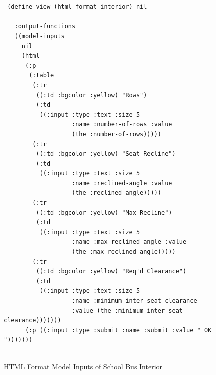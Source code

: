 \documentclass [11pt]{book}
\begin{document}
\begin{figure}
\begin{lrbox}{\boxedverb}
\begin{minipage}{\linewidth}

\begin{verbatim}


 (define-view (html-format interior) nil

   :output-functions
   ((model-inputs
     nil
     (html 
      (:p
       (:table
        (:tr 
         ((:td :bgcolor :yellow) "Rows")
         (:td
          ((:input :type :text :size 5 
                   :name :number-of-rows :value
                   (the :number-of-rows)))))
        (:tr 
         ((:td :bgcolor :yellow) "Seat Recline")
         (:td
          ((:input :type :text :size 5 
                   :name :reclined-angle :value
                   (the :reclined-angle)))))
        (:tr 
         ((:td :bgcolor :yellow) "Max Recline")
         (:td
          ((:input :type :text :size 5 
                   :name :max-reclined-angle :value
                   (the :max-reclined-angle)))))
        (:tr 
         ((:td :bgcolor :yellow) "Req'd Clearance")
         (:td
          ((:input :type :text :size 5 
                   :name :minimum-inter-seat-clearance
                   :value (the :minimum-inter-seat-clearance)))))))
      (:p ((:input :type :submit :name :submit :value " OK ")))))))      
      
\end{verbatim}
\end{minipage}
\end{lrbox}
\fbox{\usebox{\boxedverb}}

\caption{HTML Format Model Inputs of School Bus Interior}

\label{code:school-bus-interior-model-inputs}

\end{figure}
\end{document}
